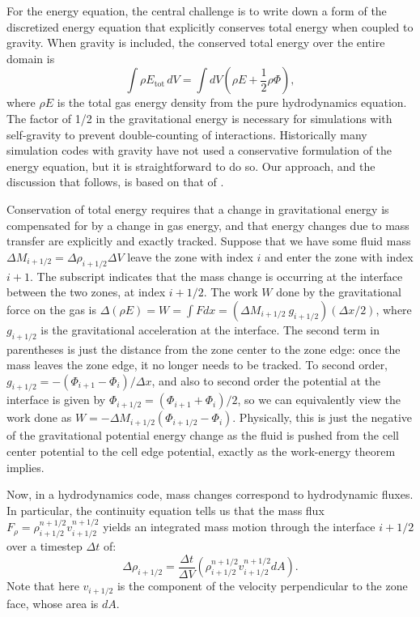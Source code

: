 \documentclass[12pt]{article}
\begin{document}
For the energy equation, the central challenge is to write down a form of the
discretized energy equation that explicitly conserves total energy when
coupled to gravity. When gravity is included, the conserved total energy
over the entire domain is
\begin{equation}
  \int \rho E_{\text{tot}}\, dV = \int dV \left(\rho E + \frac{1}{2}\rho\Phi\right), \label{eq:total_energy_gravity}
\end{equation}
where $\rho E$ is the total gas energy density from the pure hydrodynamics equation.
The factor of 1/2 in the gravitational energy is necessary for simulations with
self-gravity to prevent double-counting of interactions. Historically many simulation codes with gravity have not used
a conservative formulation of the energy equation, but it is straightforward to do so.
Our approach, and the discussion that follows, is based on that of \cite{arepo}.

Conservation of total energy requires that a change in gravitational energy is compensated
for by a change in gas energy, and that energy changes due to mass transfer are explicitly and
exactly tracked. Suppose that we have some fluid mass $\Delta M_{i+1/2} = \Delta \rho_{i+1/2} \Delta V$ leave the zone
with index $i$ and enter the zone with index $i+1$. The subscript indicates that the mass change is
occurring at the interface between the two zones, at index $i+1/2$. The work $W$ done by the gravitational
force on the gas is $\Delta (\rho E) = W = \int F dx = (\Delta M_{i+1/2}\ g_{i+1/2}) (\Delta x / 2)$,
where $g_{i+1/2}$ is the gravitational acceleration at the interface. The second term in parentheses
is just the distance from the zone center to the zone edge: once the mass leaves the zone edge, it no longer
needs to be tracked. To second order, $g_{i+1/2} = -(\Phi_{i+1} - \Phi_{i}) / \Delta x$, and also to second order the potential
at the interface is given by $\Phi_{i+1/2} = (\Phi_{i+1} + \Phi_i) / 2$, so we can equivalently view the work done
as $W = -\Delta M_{i+1/2} (\Phi_{i+1/2} - \Phi_i)$. Physically, this is just the negative of the gravitational
potential energy change as the fluid is pushed from the cell center potential to the cell edge potential,
exactly as the work-energy theorem implies.

Now, in a hydrodynamics code, mass changes correspond to hydrodynamic fluxes. In particular,
the continuity equation tells us that the mass flux $F_\rho = \rho^{n+1/2}_{i+1/2} v^{n+1/2}_{i+1/2}$ yields
an integrated mass motion through the interface $i+1/2$ over a timestep $\Delta t$ of:
\begin{equation}
  \Delta \rho_{i+1/2} = \frac{\Delta t}{\Delta V} \left(\rho^{n+1/2}_{i+1/2} v^{n+1/2}_{i+1/2} dA\right).
\end{equation}
Note that here $v_{i+1/2}$ is the component of the velocity perpendicular to the zone face, whose
area is $dA$.
\end{document}
